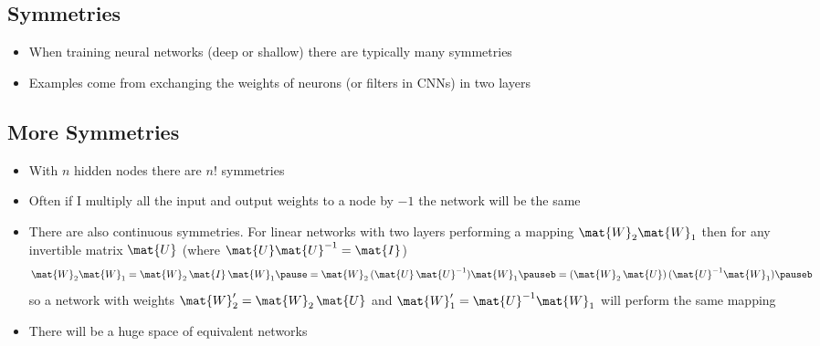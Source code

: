 \begin{slide}
\section[-2]{Symmetries}

\pb
\begin{itemize}
\item When training neural networks (deep or shallow) there are
  typically many symmetries\pauseh
\item Examples come from exchanging the weights of neurons (or
  filters in CNNs) in two layers\pauseh
  \begin{center}
    \pause
  \end{center}
\end{itemize}

\end{slide}


\begin{slide}
\section[-2]{More Symmetries}

\begin{PauseHighLight}
  \begin{itemize}
  \item With $n$ hidden nodes there are $n!$ symmetries\pause
  \item Often if I multiply all the input and output weights to a node
    by $-1$ the network will be the same\pause
  \item There are also continuous symmetries.  For linear networks
    with two layers performing a mapping $\mat{W}_2 \mat{W}_1$ then
    for any invertible matrix $\mat{U}$ (where
    $\mat{U}\mat{U}^{-1}=\mat{I}$)
    \begin{align*}
      \mat{W}_2 \mat{W}_1 = \mat{W}_2  \,\mat{I} \, \mat{W}_1\pause
      = \mat{W}_2 \,(\mat{U}\,\mat{U}^{-1}) \mat{W}_1\pauseb
     = (\mat{W}_2 \,\mat{U})\,(\mat{U}^{-1} \mat{W}_1)\pauseb
    \end{align*}
    so a network with weights $\mat{W}_2'=\mat{W}_2 \,\mat{U}$ and
    $\mat{W}_1'=\mat{U}^{-1}\mat{W}_1$ will perform the same mapping\pause
  \item There will be a huge space of equivalent networks\pause
  \end{itemize}
\end{PauseHighLight}

\end{slide}

